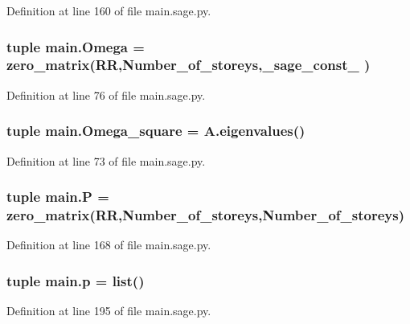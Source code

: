 Definition at line 160 of file main.\+sage.\+py.

\hypertarget{namespacemain_af44dcb60e61649c65257466d65b4d548}{}
\subsubsection[{Omega}]{\setlength{\rightskip}{0pt plus 5cm}tuple main.\+Omega = zero\+\_\+matrix(R\+R,Number\+\_\+of\+\_\+storeys,\+\_\+sage\+\_\+const\+\_ )}\label{namespacemain_af44dcb60e61649c65257466d65b4d548}


Definition at line 76 of file main.\+sage.\+py.

\hypertarget{namespacemain_a63066086ca439ff34de16475b00387f5}{}
\subsubsection[{Omega\+\_\+square}]{\setlength{\rightskip}{0pt plus 5cm}tuple main.\+Omega\+\_\+square = A.\+eigenvalues()}\label{namespacemain_a63066086ca439ff34de16475b00387f5}


Definition at line 73 of file main.\+sage.\+py.

\hypertarget{namespacemain_ad403610ba53df02f8dfaff8dd64227b3}{}
\subsubsection[{P}]{\setlength{\rightskip}{0pt plus 5cm}tuple main.\+P = zero\+\_\+matrix(R\+R,Number\+\_\+of\+\_\+storeys,Number\+\_\+of\+\_\+storeys)}\label{namespacemain_ad403610ba53df02f8dfaff8dd64227b3}


Definition at line 168 of file main.\+sage.\+py.

\hypertarget{namespacemain_ab31fc16b432d2248a6c76c6a18d741d0}{}
\subsubsection[{p}]{\setlength{\rightskip}{0pt plus 5cm}tuple main.\+p = list()}\label{namespacemain_ab31fc16b432d2248a6c76c6a18d741d0}


Definition at line 195 of file main.\+sage.\+py.

\hypertarget{namespacemain_add7e0394c94a2e2115aff785eb6995e3}{}
